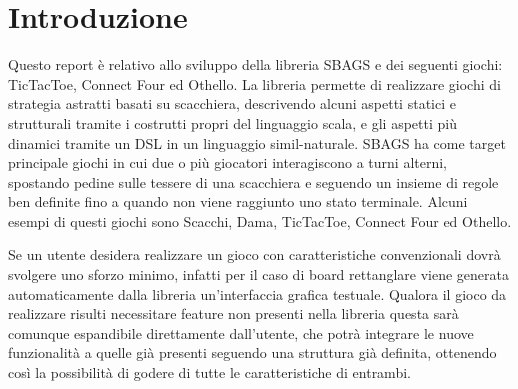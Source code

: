 \section*{Introduzione}
Questo report è relativo allo sviluppo della libreria SBAGS e dei seguenti giochi: TicTacToe, Connect Four ed Othello.
%
La libreria permette di realizzare giochi di strategia astratti basati su scacchiera, descrivendo alcuni aspetti statici e strutturali tramite i costrutti propri del linguaggio scala, e gli aspetti più dinamici tramite un DSL in un linguaggio simil-naturale.
%
SBAGS ha come target principale giochi in cui due o più giocatori interagiscono a turni alterni, spostando pedine sulle tessere di una scacchiera e seguendo un insieme di regole ben definite fino a quando non viene raggiunto uno stato terminale.
%
Alcuni esempi di questi giochi sono Scacchi, Dama, TicTacToe, Connect Four ed Othello.

Se un utente desidera realizzare un gioco con caratteristiche convenzionali dovrà svolgere uno sforzo minimo, infatti per il caso di board rettanglare viene generata automaticamente dalla libreria un'interfaccia grafica testuale.
%
Qualora il gioco da realizzare risulti necessitare feature non presenti nella libreria questa sarà comunque espandibile direttamente dall'utente, che potrà integrare le nuove funzionalità a quelle già presenti seguendo una struttura già definita, ottenendo così la possibilità di godere di tutte le caratteristiche di entrambi.


